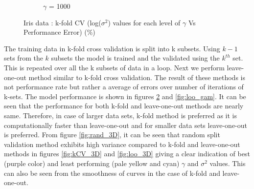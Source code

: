 {\begin{figure}[!ht]
\begin{floatrow}
{\begin{subfigure}{.3\textwidth}
				\caption{$\gamma$ = 1000}
				\label{fig:kCV_gamma(1000)}
			\end{subfigure}%
		}{%
			\caption{Iris data : k-fold CV (log($\sigma^2$) values for each level of $\gamma$ Vs Performance Error)  (\%)}\label{fig:kCV_gam}
		}
	\end{floatrow}
\end{figure}
The training data in k-fold cross validation is split into k subsets. Using $k-1$ sets from the $k$ subsets the model is trained and the validated using the $k^{th}$ set. This is repeated over all the k subsets of data in a loop. Next we perform leave-one-out method similar to k-fold cross validation. The result of these methods is not performance rate but rather a average of errors over number of iterations of k-sets. The model performance is shown in figures \ref{fig:kCV_gam} and \ref{fig:loo_gam}. It can be seen that the performance for both k-fold and leave-one-out methods are nearly same. Therefore, in case of larger data sets, k-fold method is preferred as it is computationally faster than leave-one-out and for smaller data sets leave-one-out is preferred. From figure \ref{fig:rand_3D}, it can be seen that random split validation method exhibits high variance compared to k-fold and leave-one-out methods in figures \ref{fig:kCV_3D} and \ref{fig:loo_3D} giving a clear indication of best (purple color) and least performing (pale yellow and cyan) $\gamma$ and $\sigma^2$ values.  This can also be seen from the smoothness of curves in the case of k-fold and leave-one-out.\\

}
